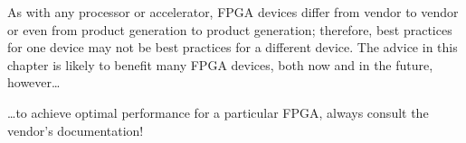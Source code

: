 As with any processor or accelerator, FPGA devices differ from vendor to vendor or even from product generation to product generation; therefore, best practices for one device may not be best practices for a different device. The advice in this chapter is likely to benefit many FPGA devices, both now and in the future, however…\par

\begin{tcolorbox}[colback=red!5!white,colframe=red!75!black]
…to achieve optimal performance for a particular FPGA, always consult the vendor’s documentation!
\end{tcolorbox}














